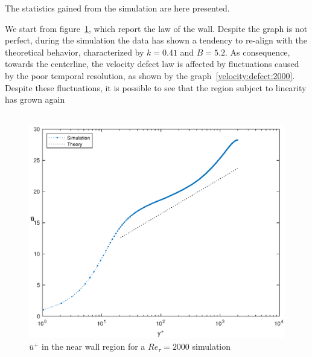 The statistics gained from the simulation are here presented.\par
We start from figure~\ref{loglaw:2000}, which report the law of the wall. Despite the graph is not perfect, during the simulation the data has shown a tendency to re-align with the theoretical behavior, characterized by $k=0.41$ and $B=5.2$. As consequence, towards the centerline, the velocity defect law is affected by fluctuations caused by the poor temporal resolution, as shown by the graph~\ref{velocity:defect:2000}. Despite these fluctuations, it is possible to see that the region subject to linearity has grown again \\~\par

\begin{figure}
\begin{center}
\includegraphics[scale=0.55]{grafici/loglaw_2000.eps}
\caption{$\bar{u}^{+}$ in the near wall region for a $Re_{\tau}=2000$ simulation}
\label{loglaw:2000}
\end{center} 
\end{figure}

